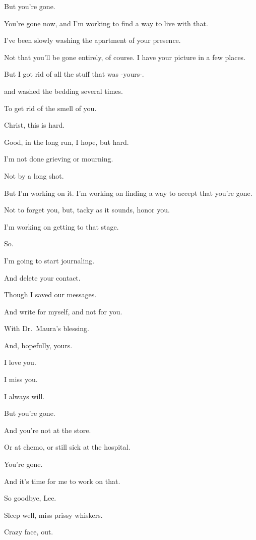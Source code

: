 { But you're gone.

 You're gone now, and I'm working to find a way to live with that.

 I've been slowly washing the apartment of your presence.

 Not that you'll be gone entirely, of course. I have your picture in a few places.

 But I got rid of all the stuff that was
-yours-.

 and washed the bedding several times.

 To get rid of the smell of you.

 Christ, this is hard.

 Good, in the long run, I hope, but hard.

 I'm not done grieving or mourning.

 Not by a long shot.

 But I'm working on it. I'm working on finding a way to accept that you're gone.

 Not to forget you, but, tacky as it sounds, honor you.

 I'm working on getting to that stage.

 So.

 I'm going to start journaling.

 And delete your contact.

 Though I saved our messages.

 And write for myself, and not for you.

 With Dr.~Maura's blessing.

 And, hopefully, yours.

 I love you.

 I miss you.

 I always will.

 But you're gone.

 And you're not at the store.

 Or at chemo, or still sick at the hospital.

 You're gone.

 And it's time for me to work on that.

 So goodbye, Lee.

 Sleep well, miss prissy whiskers.

 Crazy face, out.

} %

